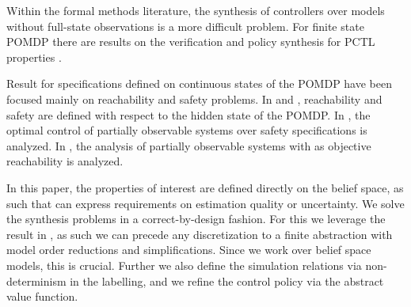 \documentclass{ifacconf}
\newcommand{\red}[1]{{\color{red} #1}}
\begin{document}
 
 Within the formal methods literature,  the synthesis of controllers over models without full-state observations is a more difficult problem. For finite state POMDP there are results on the verification and policy synthesis  for PCTL properties \cite{Norman2017, Chatterjee2014}.

Result for specifications defined on continuous states of the POMDP have been focused mainly on reachability and safety problems. 
In  \citep{ding2013optimal} and \citep{LESSER20141989}, reachability and safety  are defined with respect to the hidden state of the POMDP.
%
In \citep{ding2013optimal}, the optimal control of partially observable systems over safety specifications is analyzed. 
In \citep{LESSER20141989}, the analysis of partially observable systems with as objective reachability is analyzed. 



 In this paper, the properties of interest are defined directly on the belief space, as such that can express requirements on estimation quality or uncertainty. 
 We solve the synthesis problems in a correct-by-design fashion. For this we leverage the result in \citep{haesaert2017verification, tech_report_TACAS}, as such we can precede any discretization to a finite abstraction with model order reductions and simplifications.  Since we work over belief space models, this is crucial.  Further we also define the simulation relations via non-determinism in the labelling, and we  refine the control policy via the abstract value function.
\end{document}
